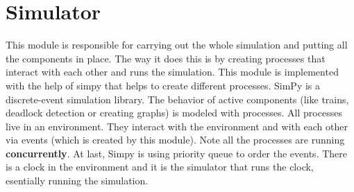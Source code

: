 \chapter{Simulator}

This module is responsible for carrying out the whole simulation and
 putting all the components in place. The way it does this is by creating
 processes that interact with each other and runs the simulation.
 This module is implemented with the help 
 of simpy that helps to create different processes. SimPy is a discrete-event simulation 
 library. The behavior of active components (like trains, deadlock detection or creating graphs) 
 is modeled with processes. All processes live in an environment. They interact with the environment 
 and with each other via events (which is created by this module). Note all the processes are 
 running \textbf{concurrently}. At last, Simpy is using priority queue to 
 order the events. There is a clock in the environment and it is the simulator that runs the clock, 
 esentially running the simulation. 

\vspace{0.25cm}

